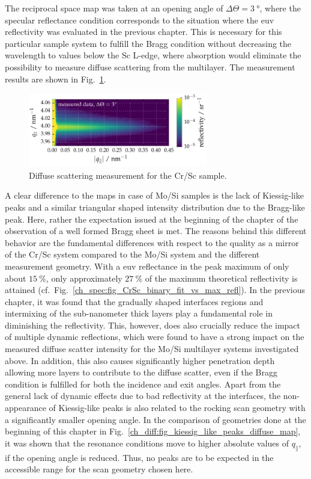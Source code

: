The reciprocal space map was taken at an opening angle of $\Delta \Theta = \SI{3}{\degree}$, where the specular reflectance condition corresponds to the situation where the \gls{euv} reflectivity was evaluated in the previous chapter. This is necessary for this particular sample system to fulfill the Bragg condition without decreasing the wavelength to values below the Sc L-edge, where absorption would eliminate the possibility to measure diffuse scattering from the multilayer. The measurement results are shown in Fig.~\ref{ch_diff:fig_CrSc_diffuse_meas}.
\begin{figure}[htbp]
  \centering
  \includegraphics[width=0.7\textwidth]{img/CrSc_diffuse_measured}
  \caption{Diffuse scattering measurement for the Cr/Sc sample.}
  \label{ch_diff:fig_CrSc_diffuse_meas}
\end{figure}
A clear difference to the maps in case of Mo/Si samples is the lack of Kiessig-like peaks and a similar triangular shaped intensity distribution due to the Bragg-like peak. Here, rather the expectation issued at the beginning of the chapter of the observation of a well formed Bragg sheet is met. The reasons behind this different behavior are the fundamental differences with respect to the quality as a mirror of the Cr/Sc system compared to the Mo/Si system and the different measurement geometry. With a \gls{euv} reflectance in the peak maximum of only about $\SI{15}{\percent}$, only approximately $\SI{27}{\percent}$ of the maximum theoretical reflectivity is attained (cf.~Fig.~\ref{ch_spec:fig_CrSc_binary_fit_vs_max_refl}). In the previous chapter, it was found that the gradually shaped interfaces regions and intermixing of the sub-nanometer thick layers play a fundamental role in diminishing the reflectivity. This, however, does also crucially reduce the impact of multiple dynamic reflections, which were found to have a strong impact on the measured diffuse scatter intensity for the Mo/Si multilayer systems investigated above. In addition, this also causes significantly higher penetration depth allowing more layers to contribute to the diffuse scatter, even if the Bragg condition is fulfilled for both the incidence and exit angles. Apart from the general lack of dynamic effects due to bad reflectivity at the interfaces, the non-appearance of Kiessig-like peaks is also related to the rocking scan geometry with a significantly smaller opening angle. In the comparison of geometries done at the beginning of this chapter in Fig.~\ref{ch_diff:fig_kiessig_like_peaks_diffuse_map}, it was shown that the resonance conditions move to higher absolute values of $q_\parallel$, if the opening angle is reduced. Thus, no peaks are to be expected in the accessible range for the scan geometry chosen here.

